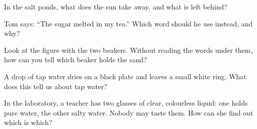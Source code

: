\begin{exercise}[$\star$]\label{exo:g2:mixing-and-dissolving:7}
In the salt ponds, what does the sun take away, and what is left
behind?
\end{exercise}

\begin{exercise}[$\star$]\label{exo:g2:mixing-and-dissolving:8}
Tom says: ``The sugar melted in my tea.'' Which word should he use
instead, and why?
\end{exercise}

\begin{exercise}[$\star\star$]\label{exo:g2:mixing-and-dissolving:9}
Look at the figure with the two beakers. Without reading the words
under them, how can you tell which beaker holds the sand?
\end{exercise}

\begin{exercise}[$\star\star$]\label{exo:g2:mixing-and-dissolving:10}
A drop of tap water dries on a black plate and leaves a small white
ring. What does this tell us about tap water?
\end{exercise}

\begin{exercise}[$\star\star$]\label{exo:g2:mixing-and-dissolving:11}
In the laboratory, a teacher has two glasses of clear, colourless
liquid: one holds pure water, the other salty water. Nobody may taste
them. How can she find out which is which?
\end{exercise}

